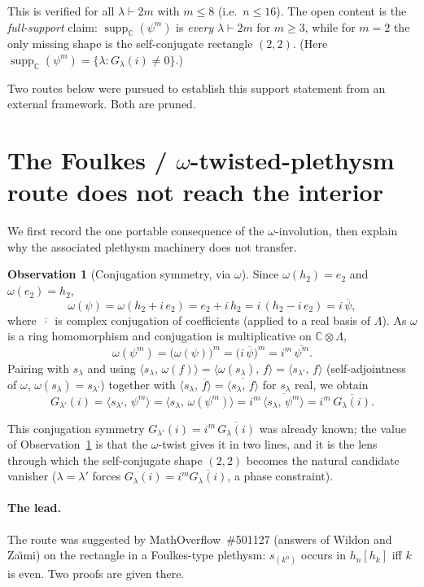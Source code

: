 \documentclass[11pt]{article}
\theoremstyle{definition}
\newtheorem{observation}{Observation}
\newcommand{\C}{\mathbb{C}}
\newcommand{\Lam}{\Lambda}
\newcommand{\ip}[2]{\langle #1,\, #2\rangle}
\DeclareMathOperator{\supp}{supp}
\begin{document}
This is verified for all $\lambda\vdash 2m$ with $m\le 8$ (i.e.\ $n\le16$).
The open content is the \emph{full-support} claim: $\supp_\C(\psi^m)$ is
\emph{every} $\lambda\vdash 2m$ for $m\ge 3$, while for $m=2$ the only
missing shape is the self-conjugate rectangle $(2,2)$. (Here
$\supp_\C(\psi^m)=\{\lambda : G_\lambda(i)\ne0\}$.)

Two routes below were pursued to establish this support statement from an
external framework. Both are pruned.

\section{The Foulkes / $\omega$-twisted-plethysm route does not reach the interior}

We first record the one portable consequence of the $\omega$-involution,
then explain why the associated plethysm machinery does not transfer.

\begin{observation}[Conjugation symmetry, via $\omega$]\label{obs:conj}
Since $\omega(h_2)=e_2$ and $\omega(e_2)=h_2$,
\[
  \omega(\psi)=\omega(h_2+i\,e_2)=e_2+i\,h_2
  = i\,(h_2 - i\,e_2)=i\,\overline{\psi},
\]
where $\overline{\,\cdot\,}$ is complex conjugation of coefficients
(applied to a real basis of $\Lam$). As $\omega$ is a ring homomorphism
and conjugation is multiplicative on $\C\otimes\Lam$,
\[
  \omega(\psi^m)=\bigl(\omega(\psi)\bigr)^m
  =\bigl(i\,\overline{\psi}\bigr)^m = i^m\,\overline{\psi^m}.
\]
Pairing with $s_\lambda$ and using $\ip{s_\lambda}{\omega(f)}
=\ip{\omega(s_\lambda)}{f}=\ip{s_{\lambda'}}{f}$ (self-adjointness of
$\omega$, $\omega(s_\lambda)=s_{\lambda'}$) together with
$\ip{s_\lambda}{\overline{f}}=\overline{\ip{s_\lambda}{f}}$ for $s_\lambda$
real, we obtain
\[
  G_{\lambda'}(i)=\ip{s_{\lambda'}}{\psi^m}
  =\ip{s_\lambda}{\omega(\psi^m)}
  = i^m\,\overline{\ip{s_\lambda}{\psi^m}}
  = i^m\,\overline{G_\lambda(i)} .
\]
\end{observation}

This conjugation symmetry $G_{\lambda'}(i)=i^m\,\overline{G_\lambda(i)}$
was already known; the value of Observation~\ref{obs:conj} is that the
$\omega$-twist gives it in two lines, and it is the lens through which the
self-conjugate shape $(2,2)$ becomes the natural candidate vanisher
($\lambda=\lambda'$ forces $G_\lambda(i)=i^m\overline{G_\lambda(i)}$, a
phase constraint).

\paragraph{The lead.} The route was suggested by MathOverflow~\#501127
(answers of Wildon and Za\u{\i}mi) on the rectangle in a Foulkes-type
plethysm: $s_{(k^n)}$ occurs in $h_n[h_k]$ iff $k$ is even. Two proofs
are given there.
\end{document}
